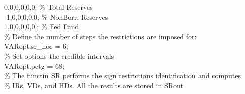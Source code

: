 \hspace{1mm}\hspace{5mm} \hspace{5mm} \hspace{5mm} 0,0,0,0,0,0;  \textcolor{matlabgreen}{\% Total Reserves }\\ 
\hspace{1mm}\hspace{5mm} \hspace{5mm} \hspace{5mm} -1,0,0,0,0,0;  \textcolor{matlabgreen}{\% NonBorr. Reserves }\\ 
\hspace{1mm}\hspace{5mm} \hspace{5mm} \hspace{5mm} 1,0,0,0,0,0]; \textcolor{matlabgreen}{\% Fed Fund }\\ 
\hspace{1mm}\hspace{5mm} \hspace{5mm} \hspace{5mm} \textcolor{matlabgreen}{\% Define the number of steps the restrictions are imposed for: }\\ 
\hspace{1mm}\hspace{5mm} \hspace{5mm} \hspace{5mm} VARopt.sr\_hor = 6; \\ 
\hspace{1mm}\hspace{5mm} \hspace{5mm} \hspace{5mm} \textcolor{matlabgreen}{\% Set options the credible intervals }\\ 
\hspace{1mm}\hspace{5mm} \hspace{5mm} \hspace{5mm} VARopt.pctg = 68; \\ 
\hspace{1mm}\hspace{5mm} \hspace{5mm} \hspace{5mm} \textcolor{matlabgreen}{\% The functin SR performs the sign restrictions identification and computes }\\ 
\hspace{1mm}\hspace{5mm} \hspace{5mm} \hspace{5mm} \textcolor{matlabgreen}{\% IRs, VDs, and HDs. All the results are stored in SRout }\\ 
